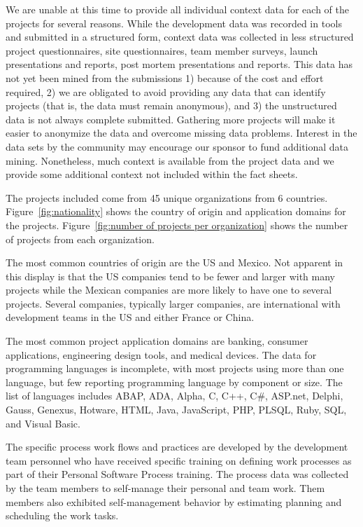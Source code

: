 \documentclass[smallcondensed]{svjour3}
\newcommand{\fig}[1]{Figure~\ref{fig:#1}}
\begin{document}
We are unable at this time to provide all individual context data for each of the projects for several reasons. While the development data was recorded in tools and submitted in a structured form, context data was collected in less structured project questionnaires, site questionnaires, team member surveys, launch presentations and reports, post mortem presentations and reports. This data has not yet been mined from the submissions 1) because of the cost and effort required, 2) we are obligated to avoid providing any data that can identify projects (that is, the data must remain anonymous), and 3) the unstructured data is not always  complete  submitted.   Gathering more projects will make it easier to anonymize the data and overcome missing data problems. Interest in the data sets by the community may encourage our sponsor to fund additional data mining.  Nonetheless, much context is available from the project data  and we provide some additional context not included within the fact sheets. 
 
 The projects included come from 45 unique organizations from 6 countries. \fig{nationality} shows the country of origin and application domains for the projects.  \fig{number of projects per organization} shows the number of projects from each organization. 
 
The most common countries of origin are the US and Mexico. Not apparent in this display is that the US companies tend to be fewer and larger with many projects while the Mexican companies are more likely to have one to several projects. Several companies, typically larger companies, are international with development teams in the US and either France or China. 

The most common project application domains are banking, consumer applications, engineering design tools, and medical devices.   
The data for programming languages is incomplete, with most projects using more than one language, but few reporting  programming language by component or size.  The list of languages includes ABAP, ADA, Alpha, C, C++, C\#, ASP.net, Delphi, Gauss, Genexus, Hotware, HTML, Java, JavaScript, PHP, PLSQL, Ruby, SQL, and Visual Basic. 
 

 The specific process work flows and practices are developed by the development team personnel who have received specific training on defining work processes as part of their Personal Software Process training. The process data was collected by the team members to self-manage their personal and team work. Them members also exhibited self-management behavior by estimating planning and scheduling the work tasks. 
\end{document}

